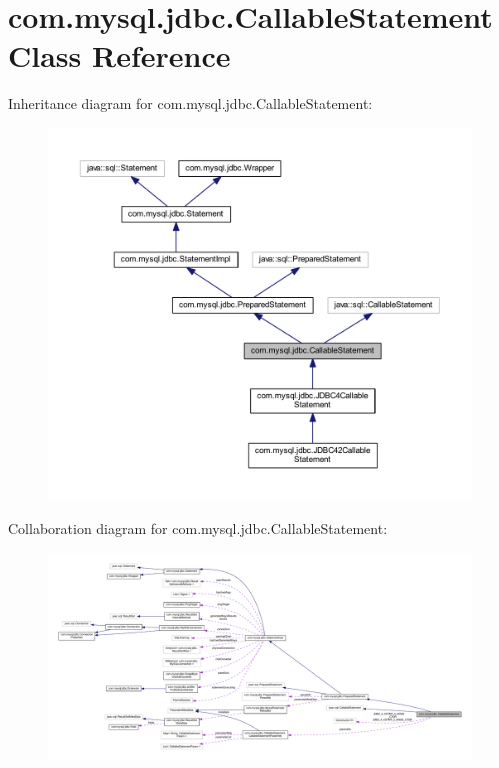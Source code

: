 \hypertarget{classcom_1_1mysql_1_1jdbc_1_1_callable_statement}{}\section{com.\+mysql.\+jdbc.\+Callable\+Statement Class Reference}
\label{classcom_1_1mysql_1_1jdbc_1_1_callable_statement}


Inheritance diagram for com.\+mysql.\+jdbc.\+Callable\+Statement\+:\nopagebreak
\begin{figure}[H]
\begin{center}
\leavevmode
\includegraphics[width=350pt]{classcom_1_1mysql_1_1jdbc_1_1_callable_statement__inherit__graph}
\end{center}
\end{figure}


Collaboration diagram for com.\+mysql.\+jdbc.\+Callable\+Statement\+:\nopagebreak
\begin{figure}[H]
\begin{center}
\leavevmode
\includegraphics[width=350pt]{classcom_1_1mysql_1_1jdbc_1_1_callable_statement__coll__graph}
\end{center}
\end{figure}
